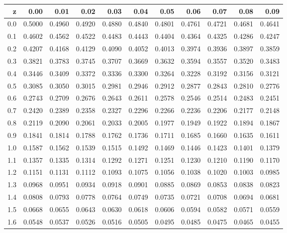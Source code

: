 \documentclass[
]{book}
\begin{document}
\begin{tabular}{r|r|r|r|r|r|r|r|r|r|r}
\hline
z & 0.00 & 0.01 & 0.02 & 0.03 & 0.04 & 0.05 & 0.06 & 0.07 & 0.08 & 0.09\\
\hline
0.0 & 0.5000 & 0.4960 & 0.4920 & 0.4880 & 0.4840 & 0.4801 & 0.4761 & 0.4721 & 0.4681 & 0.4641\\
\hline
0.1 & 0.4602 & 0.4562 & 0.4522 & 0.4483 & 0.4443 & 0.4404 & 0.4364 & 0.4325 & 0.4286 & 0.4247\\
\hline
0.2 & 0.4207 & 0.4168 & 0.4129 & 0.4090 & 0.4052 & 0.4013 & 0.3974 & 0.3936 & 0.3897 & 0.3859\\
\hline
0.3 & 0.3821 & 0.3783 & 0.3745 & 0.3707 & 0.3669 & 0.3632 & 0.3594 & 0.3557 & 0.3520 & 0.3483\\
\hline
0.4 & 0.3446 & 0.3409 & 0.3372 & 0.3336 & 0.3300 & 0.3264 & 0.3228 & 0.3192 & 0.3156 & 0.3121\\
\hline
0.5 & 0.3085 & 0.3050 & 0.3015 & 0.2981 & 0.2946 & 0.2912 & 0.2877 & 0.2843 & 0.2810 & 0.2776\\
\hline
0.6 & 0.2743 & 0.2709 & 0.2676 & 0.2643 & 0.2611 & 0.2578 & 0.2546 & 0.2514 & 0.2483 & 0.2451\\
\hline
0.7 & 0.2420 & 0.2389 & 0.2358 & 0.2327 & 0.2296 & 0.2266 & 0.2236 & 0.2206 & 0.2177 & 0.2148\\
\hline
0.8 & 0.2119 & 0.2090 & 0.2061 & 0.2033 & 0.2005 & 0.1977 & 0.1949 & 0.1922 & 0.1894 & 0.1867\\
\hline
0.9 & 0.1841 & 0.1814 & 0.1788 & 0.1762 & 0.1736 & 0.1711 & 0.1685 & 0.1660 & 0.1635 & 0.1611\\
\hline
1.0 & 0.1587 & 0.1562 & 0.1539 & 0.1515 & 0.1492 & 0.1469 & 0.1446 & 0.1423 & 0.1401 & 0.1379\\
\hline
1.1 & 0.1357 & 0.1335 & 0.1314 & 0.1292 & 0.1271 & 0.1251 & 0.1230 & 0.1210 & 0.1190 & 0.1170\\
\hline
1.2 & 0.1151 & 0.1131 & 0.1112 & 0.1093 & 0.1075 & 0.1056 & 0.1038 & 0.1020 & 0.1003 & 0.0985\\
\hline
1.3 & 0.0968 & 0.0951 & 0.0934 & 0.0918 & 0.0901 & 0.0885 & 0.0869 & 0.0853 & 0.0838 & 0.0823\\
\hline
1.4 & 0.0808 & 0.0793 & 0.0778 & 0.0764 & 0.0749 & 0.0735 & 0.0721 & 0.0708 & 0.0694 & 0.0681\\
\hline
1.5 & 0.0668 & 0.0655 & 0.0643 & 0.0630 & 0.0618 & 0.0606 & 0.0594 & 0.0582 & 0.0571 & 0.0559\\
\hline
1.6 & 0.0548 & 0.0537 & 0.0526 & 0.0516 & 0.0505 & 0.0495 & 0.0485 & 0.0475 & 0.0465 & 0.0455\\

\end{tabular}
\end{document}
